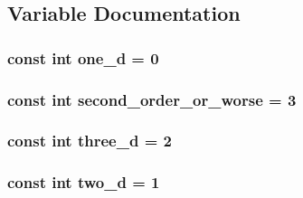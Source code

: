 \subsection{Variable Documentation}
\hypertarget{tds_8hh_a88231a35b839c2381929e567f85b4a18}{
\subsubsection[{one\-\_\-d}]{\setlength{\rightskip}{0pt plus 5cm}const int one\-\_\-d = 0}}\label{tds_8hh_a88231a35b839c2381929e567f85b4a18}
\hypertarget{tds_8hh_ab1496fd546727f3adb6f747b949ca321}{
\subsubsection[{second\-\_\-order\-\_\-or\-\_\-worse}]{\setlength{\rightskip}{0pt plus 5cm}const int second\-\_\-order\-\_\-or\-\_\-worse = 3}}\label{tds_8hh_ab1496fd546727f3adb6f747b949ca321}
\hypertarget{tds_8hh_a8666c0e8e18ef6e03200f38bb07c551f}{
\subsubsection[{three\-\_\-d}]{\setlength{\rightskip}{0pt plus 5cm}const int three\-\_\-d = 2}}\label{tds_8hh_a8666c0e8e18ef6e03200f38bb07c551f}
\hypertarget{tds_8hh_a3026d66c175dfab197999c3aa65f6b55}{
\subsubsection[{two\-\_\-d}]{\setlength{\rightskip}{0pt plus 5cm}const int two\-\_\-d = 1}}\label{tds_8hh_a3026d66c175dfab197999c3aa65f6b55}
